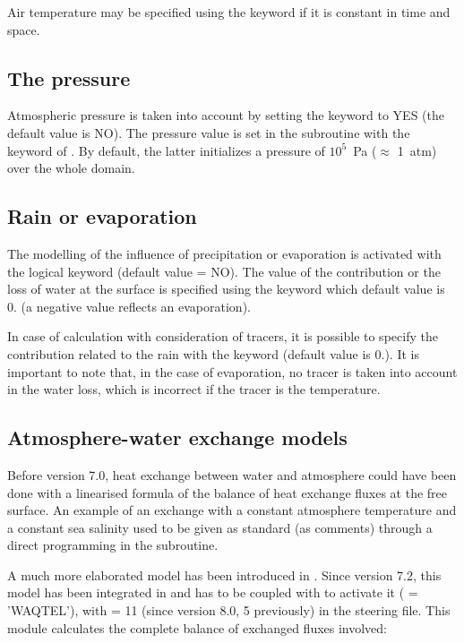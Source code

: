 Air temperature may be specified using the keyword  if
it is constant in time and space.


\subsection{The pressure}

Atmospheric pressure is taken into account by setting the keyword
 to YES (the default value is NO).
The pressure value is set in the  subroutine
with the keyword of .
By default, the latter initializes a pressure of $10^5$~Pa ($\approx$ 1~atm) over
the whole domain.


\subsection{Rain or evaporation}

The modelling of the influence of precipitation or evaporation is activated
with the logical keyword  (default value = NO).
The value of the
contribution or the loss of water at the surface is specified using the keyword
 which default value is 0. (a
negative value reflects an evaporation).

In case of calculation with consideration of tracers, it is possible to specify
the contribution related to the rain with the keyword  (default value is 0.). It is important to note that, in the case
of evaporation, no tracer is taken into account in the water loss, which is
incorrect if the tracer is the temperature.

\subsection{Atmosphere-water exchange models}

Before version 7.0, heat exchange between water and atmosphere could have been
done with a linearised formula of the balance of heat exchange fluxes at the
free surface. An example of an exchange with a constant atmosphere temperature
and a constant sea salinity used to be given as standard (as comments) through a
direct programming in the  subroutine.

A much more elaborated model has been introduced in .
Since version 7.2, this model has been integrated in \waqtel and
 has to be coupled with \waqtel to activate it
( = 'WAQTEL'), with
 = 11 (since version 8.0, 5 previously)
in the \waqtel steering file.
This module calculates the complete balance of exchanged fluxes involved:

